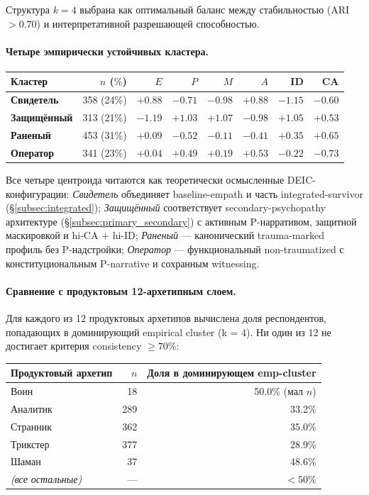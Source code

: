 Структура $k = 4$ выбрана как оптимальный баланс между стабильностью (ARI~$> 0.70$) и интерпретативной разрешающей способностью.

\paragraph{Четыре эмпирически устойчивых кластера.}

\begin{center}
\small
\begin{tabular}{lrrrrrrr}
\toprule
Кластер & $n$ ($\%$) & $E$ & $P$ & $M$ & $A$ & ID & CA \\
\midrule
\textbf{Свидетель} & 358 (24\%) & $+0.88$ & $-0.71$ & $-0.98$ & $+0.88$ & $-1.15$ & $-0.60$ \\
\textbf{Защищённый} & 313 (21\%) & $-1.19$ & $+1.03$ & $+1.07$ & $-0.98$ & $+1.05$ & $+0.53$ \\
\textbf{Раненый} & 453 (31\%) & $+0.09$ & $-0.52$ & $-0.11$ & $-0.41$ & $+0.35$ & $+0.65$ \\
\textbf{Оператор} & 341 (23\%) & $+0.04$ & $+0.49$ & $+0.19$ & $+0.53$ & $-0.22$ & $-0.73$ \\
\bottomrule
\end{tabular}
\end{center}

Все четыре центроида читаются как теоретически осмысленные DEIC-конфигурации: \emph{Свидетель} объединяет baseline-empath и часть integrated-survivor (§\ref{subsec:integrated}); \emph{Защищённый} соответствует secondary-psychopathy архитектуре (§\ref{subsec:primary_secondary}) с активным P-нарративом, защитной маскировкой и hi-CA + hi-ID; \emph{Раненый} --- канонический trauma-marked профиль без P-надстройки; \emph{Оператор} --- функциональный non-traumatized с конституциональным P-narrative и сохранным witnessing.

\paragraph{Сравнение с продуктовым 12-архетипным слоем.} Для каждого из 12 продуктовых архетипов вычислена доля респондентов, попадающих в доминирующий empirical cluster (k = 4). Ни один из 12 не достигает критерия consistency $\geq 70$\%:

\begin{center}
\small
\begin{tabular}{lrr}
\toprule
Продуктовый архетип & $n$ & Доля в доминирующем emp-cluster \\
\midrule
Воин & 18 & 50.0\% (мал $n$) \\
Аналитик & 289 & 33.2\% \\
Странник & 362 & 35.0\% \\
Трикстер & 377 & 28.9\% \\
Шаман & 37 & 48.6\% \\
\textit{(все остальные)} & --- & $< 50\%$ \\
\bottomrule
\end{tabular}
\end{center}

